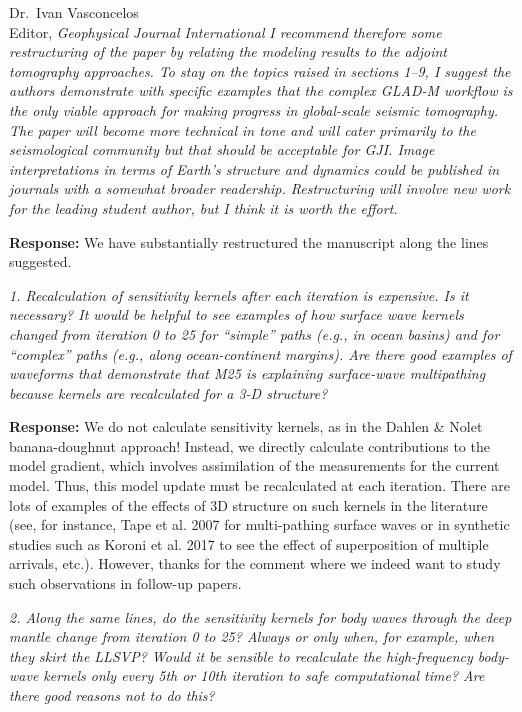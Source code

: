 \documentclass[11pt,a4paper]{letter}
\newcommand{\response}[1]{\textbf{Response:} #1}
\newcommand{\rev}[1]{{\it{#1}}}
\begin{document}
\begin{letter}{Dr.~Ivan Vasconcelos\\
Editor, \textit{Geophysical Journal International}}
\rev{I recommend therefore some restructuring of the paper by relating the modeling results to the adjoint tomography approaches. To stay on the topics raised in sections 1--9, I suggest the authors demonstrate with specific examples that the complex GLAD-M workflow is the only viable approach for making progress in global-scale seismic tomography. The paper will become more technical in tone and will cater primarily to the seismological community but that should be acceptable for GJI. Image interpretations in terms of Earth's structure and dynamics could be published in journals with a somewhat broader readership. Restructuring will involve new work for the leading student author, but I think it is worth the effort.
}

\response{We have substantially restructured the manuscript along the lines suggested.}

\rev{1. Recalculation of sensitivity kernels after each iteration is expensive. Is it necessary?
It would be helpful to see examples of how surface wave kernels changed from iteration 0 to 25 for ``simple'' paths (e.g., in ocean basins) and for ``complex'' paths (e.g., along ocean-continent margins). Are there good examples of waveforms that demonstrate that M25 is explaining surface-wave multipathing because kernels are recalculated for a 3-D structure?
}

\response{We do not calculate sensitivity kernels, as in the Dahlen \& Nolet banana-doughnut approach! Instead, we directly calculate contributions to the model gradient, which involves assimilation of the measurements for the current model. Thus, this model update must be recalculated at each iteration.
There are lots of examples of the effects of 3D structure on such kernels in the literature (see, for instance, Tape et al. 2007 for multi-pathing surface waves or in synthetic studies such as Koroni et al. 2017 to see the effect of superposition of multiple arrivals, etc.). However, thanks for the comment where we indeed want to study such observations in follow-up papers.}

\rev{2. Along the same lines, do the sensitivity kernels for body waves through the deep mantle change from iteration 0 to 25? Always or only when, for example, when they skirt the LLSVP? Would it be sensible to recalculate the high-frequency body-wave kernels only every 5th or 10th iteration to safe computational time? Are there good reasons not to do this?
}


\end{letter}
\end{document}
